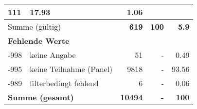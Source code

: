 \begin{longtable}{lXrrr}
       \num{111} &
       \num[round-mode=places,round-precision=2]{17,93} &
         \num[round-mode=places,round-precision=2]{1,06} \\
     \midrule
     \multicolumn{2}{l}{Summe (gültig)} &
       \textbf{\num{619}} &
     \textbf{100} &
       \textbf{\num[round-mode=places,round-precision=2]{5,9}} \\
     \multicolumn{5}{l}{\textbf{Fehlende Werte}}\\
       -998 &
       keine Angabe &
         \num{51} &
        - &
         \num[round-mode=places,round-precision=2]{0,49} \\
       -995 &
       keine Teilnahme (Panel) &
         \num{9818} &
        - &
         \num[round-mode=places,round-precision=2]{93,56} \\
       -989 &
       filterbedingt fehlend &
         \num{6} &
        - &
         \num[round-mode=places,round-precision=2]{0,06} \\
     \midrule
     \multicolumn{2}{l}{\textbf{Summe (gesamt)}} &
          \textbf{\num{10494}} &
        \textbf{-} &
        \textbf{100} \\
     \bottomrule
     \end{longtable}
     
